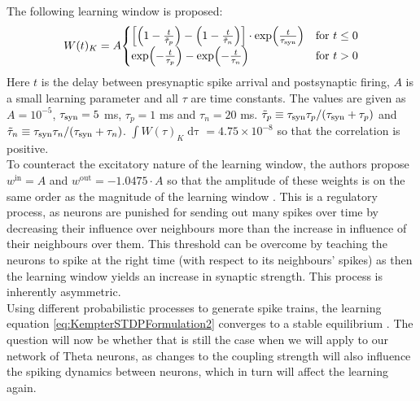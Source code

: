 The following learning window is proposed:
\begin{align}
W(t)_K = A
\begin{cases}
\left[\left(1-\frac{t}{\tilde{\tau}_{p}}\right) - \left(1-\frac{t}{\tilde{\tau}_{n}}\right)\right] \cdot \exp \left( \frac{t}{\tau_{\rm syn}} \right) & \text{for } t \leq 0 \\
 \exp \left(-\frac{t}{\tau_{p}}\right) - \exp \left(-\frac{t}{\tau_{n}} \right) & \text{for } t > 0
\end{cases} \label{eq:learningwindowKempter1999}
\end{align}
Here $t$ is the delay between presynaptic spike arrival and postsynaptic firing, $A$ is a small learning parameter and all $\tau$ are time constants. The values are given as $A = 10^{-5}$, $\tau_{\rm syn} = 5$ ms, $\tau_{p} = 1$ ms and $\tau_{n} = 20$ ms. $\tilde{\tau}_{p} \equiv \tau_{\rm syn} \tau_{p} / (\tau_{\rm syn} + \tau_{p})$ and $\tilde{\tau}_{n} \equiv \tau_{\rm syn} \tau_{n} / (\tau_{\rm syn} + \tau_{n})$. $\int W(\tau)_K \mathop{d \tau} = 4.75 \times 10^{-8}$ so that the correlation is positive. \\

To counteract the excitatory nature of the learning window, the authors propose $w^{\mathrm{in}} = A$ and $w^{\mathrm{out}} = -1.0475 \cdot A$ so that the amplitude of these weights is on the same order as the magnitude of the learning window \cite{Kempter1999}. This is a regulatory process, as neurons are punished for sending out  many spikes over time by decreasing their influence over neighbours more than the increase in influence of their neighbours over them. This threshold can be overcome by teaching the neurons to spike at the right time (with respect to its neighbours' spikes) as then the learning window yields an increase in synaptic strength. This process is inherently asymmetric. \\

Using different probabilistic processes to generate spike trains, the learning equation \eqref{eq:KempterSTDPFormulation2} converges to a stable equilibrium \cite{Kempter1999}. The question will now be whether that is still the case when we will apply \STDP to our network of Theta neurons, as changes to the coupling strength will also influence the spiking dynamics between neurons, which in turn will affect the learning again.\\

